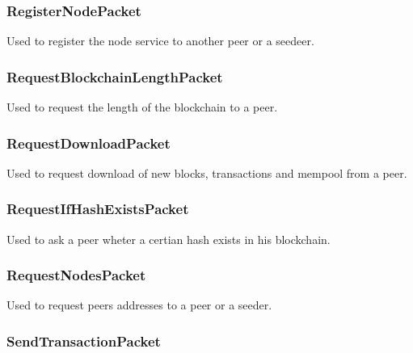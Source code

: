 \documentclass[../documentation.tex]{subfiles}
\begin{document}

\subsubsection{RegisterNodePacket}

Used to register the node service to another peer or a seedeer.


\subsubsection{RequestBlockchainLengthPacket}

Used to request the length of the blockchain to a peer.

\packettabular{}

\subsubsection{RequestDownloadPacket}

Used to request download of new blocks, transactions and mempool
from a peer.


\subsubsection{RequestIfHashExistsPacket}

Used to ask a peer wheter a certian hash exists in his blockchain.


\subsubsection{RequestNodesPacket}

Used to request peers addresses to a peer or a seeder.


\subsubsection{SendTransactionPacket}
\end{document}
